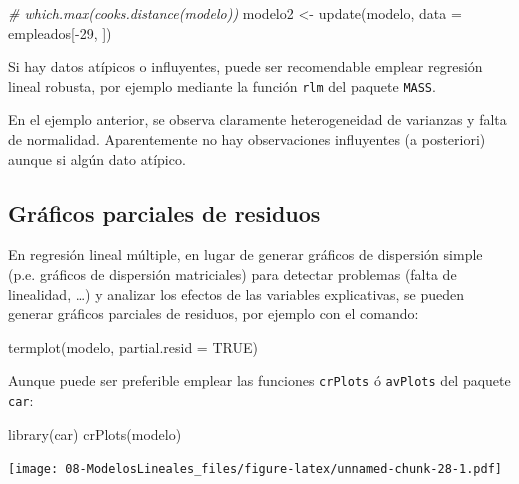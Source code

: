 \documentclass[
]{book}
\newenvironment{Shaded}{\begin{snugshade}}{\end{snugshade}}
\newcommand{\AttributeTok}[1]{\textcolor[rgb]{0.77,0.63,0.00}{#1}}
\newcommand{\CommentTok}[1]{\textcolor[rgb]{0.56,0.35,0.01}{\textit{#1}}}
\newcommand{\ConstantTok}[1]{\textcolor[rgb]{0.00,0.00,0.00}{#1}}
\newcommand{\DecValTok}[1]{\textcolor[rgb]{0.00,0.00,0.81}{#1}}
\newcommand{\FunctionTok}[1]{\textcolor[rgb]{0.00,0.00,0.00}{#1}}
\newcommand{\NormalTok}[1]{#1}
\newcommand{\OtherTok}[1]{\textcolor[rgb]{0.56,0.35,0.01}{#1}}
\newcommand{\SpecialCharTok}[1]{\textcolor[rgb]{0.00,0.00,0.00}{#1}}
\theoremstyle{break}
\begin{document}
\begin{Shaded}
\begin{Highlighting}[]
\CommentTok{\# which.max(cooks.distance(modelo))}
\NormalTok{modelo2 }\OtherTok{\textless{}{-}} \FunctionTok{update}\NormalTok{(modelo, }\AttributeTok{data =}\NormalTok{ empleados[}\SpecialCharTok{{-}}\DecValTok{29}\NormalTok{, ])}
\end{Highlighting}
\end{Shaded}

Si hay datos atípicos o influyentes, puede ser recomendable emplear regresión lineal robusta, por ejemplo mediante la función \texttt{rlm} del paquete \texttt{MASS}.

En el ejemplo anterior, se observa claramente heterogeneidad de varianzas y falta de normalidad. Aparentemente no hay observaciones influyentes (a posteriori) aunque si algún dato atípico.

\hypertarget{gruxe1ficos-parciales-de-residuos}{%
\subsection{Gráficos parciales de residuos}\label{gruxe1ficos-parciales-de-residuos}}

En regresión lineal múltiple, en lugar de generar gráficos de dispersión simple
(p.e. gráficos de dispersión matriciales) para detectar problemas (falta de
linealidad, \ldots) y analizar los efectos de las variables explicativas,
se pueden generar gráficos parciales de residuos, por ejemplo con el comando:

\begin{Shaded}
\begin{Highlighting}[]
\FunctionTok{termplot}\NormalTok{(modelo, }\AttributeTok{partial.resid =} \ConstantTok{TRUE}\NormalTok{)}
\end{Highlighting}
\end{Shaded}

Aunque puede ser preferible emplear las funciones \texttt{crPlots} ó \texttt{avPlots} del paquete \texttt{car}:

\begin{Shaded}
\begin{Highlighting}[]
\FunctionTok{library}\NormalTok{(car)}
\FunctionTok{crPlots}\NormalTok{(modelo)}
\end{Highlighting}
\end{Shaded}

\texttt{[image: 08-ModelosLineales\_files/figure-latex/unnamed-chunk-28-1.pdf]}
\end{document}
